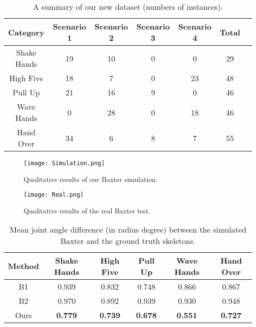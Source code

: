 \documentclass[letterpaper, 10 pt, conference]{ieeeconf}  %
\begin{document}
\begin{table}[t!]\scriptsize
\caption{A summary of our new dataset (numbers of instances).}
\vspace{-10pt}
\label{table:dataset}
\begin{center}
\tabcolsep=0.08cm
\begin{tabular}{|c|c|c|c|c|c|c|}
\hline
Category & Scenario 1 & Scenario 2 & Scenario 3 & Scenario 4 & Total\\ \hline%
Shake Hands & 19 & 10 & 0 & 0 & 29\\ \hline
High Five & 18 & 7 & 0 & 23 & 48\\ \hline
Pull Up & 21 & 16 &	9 & 0 & 46 \\ \hline
Wave Hands & 0 & 28 & 0 & 18 & 46\\ \hline
Hand Over & 34 & 6 & 8 & 7 & 55 \\
\hline
\end{tabular}
\end{center}
\vspace{-5pt}
\end{table}


\begin{figure*}[t!]
    \centering
    \texttt{[image: Simulation.png]}
    \vspace{-5pt}
    \caption{Qualitative results of our Baxter simulation.}
    \vspace{-10pt}
    \label{fig:simulation}
\end{figure*}

\begin{figure*}[t!]
    \centering
    \texttt{[image: Real.png]}
    \vspace{-15pt}
    \caption{Qualitative results of the real Baxter test.}
    \vspace{-10pt}
    \label{fig:real}
\end{figure*}

\begin{table}[t!]\scriptsize
\caption{Mean joint angle difference (in radius degree) between the simulated Baxter and the ground truth skeletons.}
\label{table:quantitative}
\vspace{-5pt}
\centering
\tabcolsep=0.10cm
\begin{tabular}{c|c|c|c|c|c} \hline
Method   & Shake Hands & High Five & Pull Up & Wave Hands & Hand Over \\ \hline
B1 &   0.939 & 0.832 & 0.748 & 0.866 & 0.867    \\ \hline
B2  &   0.970 & 0.892 & 0.939 & 0.930 & 0.948   \\ \hline
Ours & \textbf{0.779} & \textbf{0.739} & \textbf{0.678} & \textbf{0.551} & \textbf{0.727} \\ \hline
\end{tabular}
\end{table}
\end{document}
